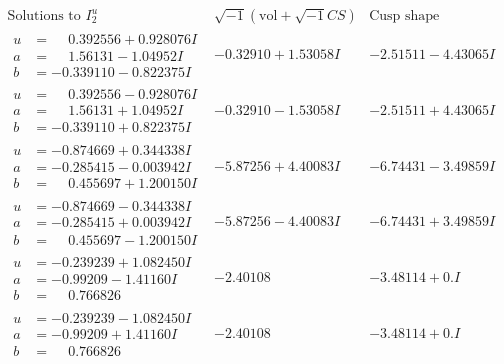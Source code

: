 \documentclass[1p]{elsarticle_modified}
\theoremstyle{definition}
\newcommand{\I}{\sqrt{-1}}
\begin{document}
$$\begin{array}{c|c|c}  
\text{Solutions to }I^u_{2}& \I (\text{vol} + \sqrt{-1}CS) & \text{Cusp shape}\\
 \hline 
\begin{aligned}
u &= \phantom{-}0.392556 + 0.928076 I \\
a &= \phantom{-}1.56131 - 1.04952 I \\
b &= -0.339110 - 0.822375 I\end{aligned}
 & -0.32910 + 1.53058 I & -2.51511 - 4.43065 I \\ \hline\begin{aligned}
u &= \phantom{-}0.392556 - 0.928076 I \\
a &= \phantom{-}1.56131 + 1.04952 I \\
b &= -0.339110 + 0.822375 I\end{aligned}
 & -0.32910 - 1.53058 I & -2.51511 + 4.43065 I \\ \hline\begin{aligned}
u &= -0.874669 + 0.344338 I \\
a &= -0.285415 - 0.003942 I \\
b &= \phantom{-}0.455697 + 1.200150 I\end{aligned}
 & -5.87256 + 4.40083 I & -6.74431 - 3.49859 I \\ \hline\begin{aligned}
u &= -0.874669 - 0.344338 I \\
a &= -0.285415 + 0.003942 I \\
b &= \phantom{-}0.455697 - 1.200150 I\end{aligned}
 & -5.87256 - 4.40083 I & -6.74431 + 3.49859 I \\ \hline\begin{aligned}
u &= -0.239239 + 1.082450 I \\
a &= -0.99209 - 1.41160 I \\
b &= \phantom{-}0.766826\phantom{ +0.000000I}\end{aligned}
 & -2.40108\phantom{ +0.000000I} & -3.48114 + 0. I\phantom{ +0.000000I} \\ \hline\begin{aligned}
u &= -0.239239 - 1.082450 I \\
a &= -0.99209 + 1.41160 I \\
b &= \phantom{-}0.766826\phantom{ +0.000000I}\end{aligned}
 & -2.40108\phantom{ +0.000000I} & -3.48114 + 0. I\phantom{ +0.000000I} \\ \hline\begin{aligned}

\end{aligned}
\end{array}$$
\end{document}
